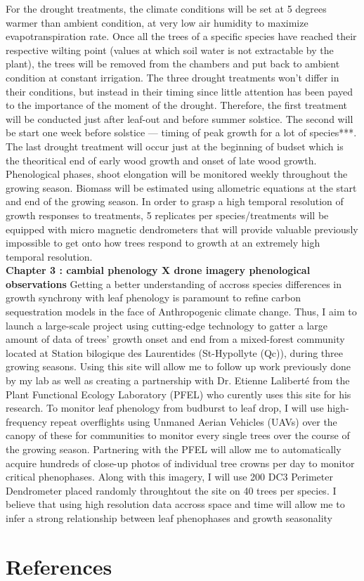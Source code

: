 \documentclass[12pt]{article}
\begin{document}
For the drought treatments, the climate conditions will be set at 5 degrees warmer than ambient condition, at very low air humidity to maximize evapotranspiration rate. Once all the trees of a specific species have reached their respective wilting point (values at which soil water is not extractable by the plant), the trees will be removed from the chambers and put back to ambient condition at constant irrigation. The three drought treatments won't differ in their conditions, but instead in their timing since little attention has been payed to the importance of the moment of the drought. Therefore, the first treatment will be conducted just after leaf-out and before summer solstice. The second will be start one week before solstice --- timing of peak growth for a lot of species***. The last drought treatment will occur just at the beginning of budset which is the theoritical end of early wood growth and onset of late wood growth. Phenological phases, shoot elongation will be monitored weekly throughout the growing season. Biomass will be estimated using allometric equations at the start and end of the growing season. In order to grasp a high temporal resolution of growth responses to treatments, 5 replicates per species/treatments will be equipped with micro magnetic dendrometers that will provide valuable previously impossible to get onto how trees respond to growth at an extremely high temporal resolution. \\


\textbf{Chapter 3 : cambial phenology X drone imagery phenological observations}
Getting a better understanding of accross species differences in growth synchrony with leaf phenology is paramount to refine carbon sequestration models in the face of Anthropogenic climate change. Thus, I aim to launch a large-scale project using cutting-edge technology to gatter a large amount of data of trees' growth onset and end from a mixed-forest community located at Station bilogique des Laurentides (St-Hypollyte (Qc)), during three growing seasons. Using this site will allow me to follow up work previously done by my lab as well as creating a partnership with Dr. Etienne Laliberté from the Plant Functional Ecology Laboratory (PFEL) who curently uses this site for his research. To monitor leaf phenology from budburst to leaf drop, I will use high-frequency repeat overflights using Unmaned Aerian Vehicles (UAVs) over the canopy of these for communities to monitor every single trees over the course of the growing season. Partnering with the PFEL will allow me to automatically acquire hundreds of close-up photos of individual tree crowns per day to monitor critical phenophases. Along with this imagery, I will use 200 DC3 Perimeter Dendrometer placed randomly throughtout the site on 40 trees per species. I believe that using high resolution data accross space and time will allow me to infer a strong relationship between leaf phenophases and growth seasonality

\section*{References}

\end{document}
